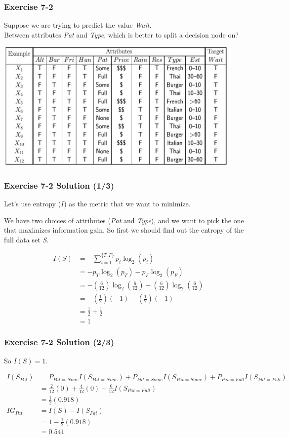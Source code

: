 \begin{frame}
\frametitle{Exercise 7-2}

Suppose we are trying to predict the value \textit{Wait}. \\
Between attributes \textit{Pat} and \textit{Type}, which is better to split a decision node on?

\begin{center}
  \includegraphics[width=0.9\textwidth]{images/decision_matrix.png}
\end{center}

\end{frame}


\begin{frame}
\frametitle{Exercise 7-2 Solution (1/3)}

Let's use entropy ($I$) as the metric that we want to minimize.

We have two choices of attributes (\textit{Pat} and \textit{Type}), and we want to pick the one that maximizes information gain. So first we should find out the entropy of the full data set $S$.

\begin{align*}
  I(S) &= -\sum_{i=1}^{\{T, F\}}p_i\log_2(p_i) \\
  &= -p_T\log_2(p_T) - p_F\log_2(p_F) \\
  &= -(\frac{6}{12})\log_2(\frac{6}{12}) - (\frac{6}{12})\log_2(\frac{6}{12}) \\
  &= -(\frac{1}{2})(-1) - (\frac{1}{2})(-1) \\
  &= \frac{1}{2} + \frac{1}{2} \\
  &= 1
\end{align*}

\end{frame}


\begin{frame}
\frametitle{Exercise 7-2 Solution (2/3)}

So $I(S) = 1$.

\begin{align*}
  I(S_{Pat}) &= P_{Pat=None}I(S_{Pat=None}) + P_{Pat=Some}I(S_{Pat=Some}) + P_{Pat=Full}I(S_{Pat=Full}) \\
  &= \frac{2}{12}(0) + \frac{4}{12}(0) + \frac{6}{12}I(S_{Pat=Full}) \\
  &= \frac{1}{2} (0.918) \\
  IG_{Pat} &= I(S) - I(S_{Pat}) \\
  &= 1 - \frac{1}{2} (0.918) \\
  &= 0.541
\end{align*}

\end{frame}


